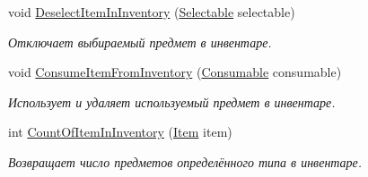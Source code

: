 \begin{DoxyCompactItemize}
void \hyperlink{class_a_s_c_i_i_wars_1_1_game_1_1_player_a104ae32d59b6e627d55dc78ff4ffa995}{Deselect\+Item\+In\+Inventory} (\hyperlink{class_a_s_c_i_i_wars_1_1_game_1_1_selectable}{Selectable} selectable)
\begin{DoxyCompactList}\small\item\em Отключает выбираемый предмет в инвентаре. \end{DoxyCompactList}\item 
void \hyperlink{class_a_s_c_i_i_wars_1_1_game_1_1_player_ac1b40c126e1d9ec4f45f7831a86497ba}{Consume\+Item\+From\+Inventory} (\hyperlink{class_a_s_c_i_i_wars_1_1_game_1_1_consumable}{Consumable} consumable)
\begin{DoxyCompactList}\small\item\em Использует и удаляет используемый предмет в инвентаре. \end{DoxyCompactList}\item 
int \hyperlink{class_a_s_c_i_i_wars_1_1_game_1_1_player_acb07b9e02dfe26cae85c1b685517438b}{Count\+Of\+Item\+In\+Inventory} (\hyperlink{class_a_s_c_i_i_wars_1_1_game_1_1_item}{Item} item)
\begin{DoxyCompactList}\small\item\em Возвращает число предметов определённого типа в инвентаре. \end{DoxyCompactList}\end{DoxyCompactItemize}
